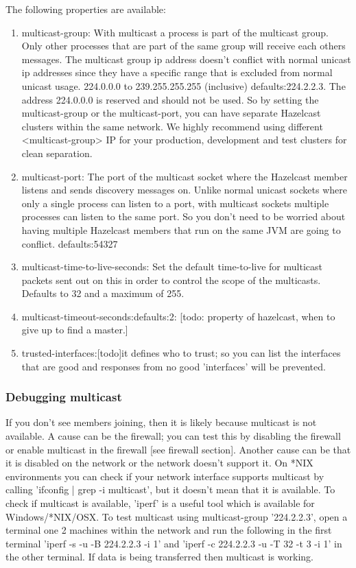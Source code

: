 The following properties are available:
\begin{enumerate}
\item multicast-group: With multicast a process is part of the multicast group. Only other processes that are part of the same group will receive each others messages. The multicast group ip address doesn't conflict with normal unicast ip addresses since they have a specific range that is excluded from normal unicast usage. 224.0.0.0 to 239.255.255.255 (inclusive) defaults:224.2.2.3. The address 224.0.0.0 is reserved and should not be used.  So by setting the multicast-group or the multicast-port, you can have separate Hazelcast clusters within the same network. We highly recommend using different <multicast-group> IP for your production, development and test clusters for clean separation.
\item multicast-port: The port of the multicast socket where the Hazelcast member listens and sends discovery messages on. Unlike normal unicast sockets where only a single process can listen to a port, with multicast sockets multiple processes can listen to the same port. So you don't need to be worried about having multiple Hazelcast members that run on the same JVM are going to conflict. defaults:54327
\item multicast-time-to-live-seconds: Set the default time-to-live for multicast packets sent out on this in order to control the scope of the multicasts. Defaults to 32 and a maximum of 255.
\item multicast-timeout-seconds:defaults:2: [todo: property of hazelcast, when to give up to find a master.]
\item trusted-interfaces:[todo]it defines who to trust; so you can list the interfaces that are good and responses from no good 'interfaces' will be prevented.
\end{enumerate}

\subsubsection{Debugging multicast}
If you don't see members joining, then it is likely because multicast is not available. A cause can be the firewall; you can test this by disabling the firewall or enable multicast in the firewall [see firewall section]. Another cause can be that it is disabled on the network or the network doesn't support it. On *NIX environments you can check if your network interface supports multicast by calling 'ifconfig | grep -i multicast', but it doesn't mean that it is available. To check if multicast is available, 'iperf' is a useful tool which is available for Windows/*NIX/OSX. To test multicast using multicast-group '224.2.2.3', open a terminal one 2 machines within the network and run the following in the first terminal 'iperf -s -u -B 224.2.2.3 -i 1' and 'iperf -c 224.2.2.3 -u -T 32 -t 3 -i 1' in the other terminal. If data is being transferred then multicast is working.

